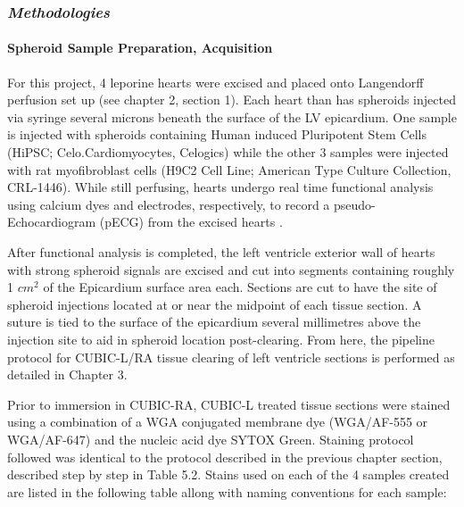 \subsubsection{\textit{Methodologies}}
\paragraph{Spheroid Sample Preparation, Acquisition}
For this project, 4 leporine hearts were excised and placed onto Langendorff perfusion set up (see chapter 2, section 1). Each heart than has spheroids injected via syringe several microns beneath the surface of the LV epicardium. One sample is injected with spheroids containing Human induced Pluripotent Stem Cells (HiPSC; Celo.Cardiomyocytes, Celogics) while the other 3 samples were injected with rat myofibroblast cells (H9C2 Cell Line; American Type Culture Collection, CRL-1446). While still perfusing, hearts undergo real time functional analysis using calcium dyes and electrodes, respectively, to record a pseudo-Echocardiogram (pECG) from the excised hearts \cite{huethorst_evidence_2025}. 

After functional analysis is completed, the left ventricle exterior wall of hearts with strong spheroid signals are excised and cut into segments containing roughly 1 \(cm^2\) of the Epicardium surface area each. Sections are cut to have the site of spheroid injections located at or near the midpoint of each tissue section. A suture is tied to the surface of the epicardium several millimetres above the injection site to aid in spheroid location post-clearing. From here, the pipeline protocol for CUBIC-L/RA tissue clearing of left ventricle sections is performed as detailed in Chapter 3.

Prior to immersion in CUBIC-RA, CUBIC-L treated tissue sections were stained using a combination of a WGA conjugated membrane dye (WGA/AF-555 or WGA/AF-647) and the nucleic acid dye SYTOX Green. Staining protocol followed was identical to the protocol described in the previous chapter section, described step by step in Table 5.2. Stains used on each of the 4 samples created are listed in the following table allong with naming conventions for each sample:


